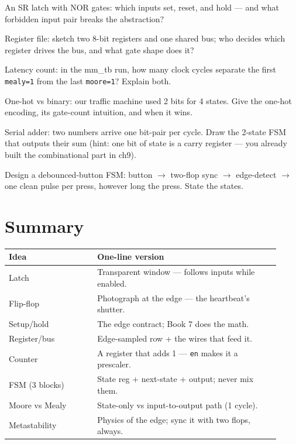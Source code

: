 \begin{exercise}[easy]
An SR latch with NOR gates: which inputs set, reset, and hold — and what
forbidden input pair breaks the abstraction?
\end{exercise}
\begin{exercise}[medium]
Register file: sketch two 8-bit registers and one shared bus; who decides
which register drives the bus, and what gate shape does it?
\end{exercise}
\begin{exercise}[medium]
Latency count: in the mm\_tb run, how many clock cycles separate the
first \texttt{mealy=1} from the last \texttt{moore=1}? Explain both.
\end{exercise}
\begin{exercise}[medium]
One-hot vs binary: our traffic machine used 2 bits for 4 states. Give
the one-hot encoding, its gate-count intuition, and when it wins.
\end{exercise}
\begin{exercise}[medium]
Serial adder: two numbers arrive one bit-pair per cycle. Draw the 2-state
FSM that outputs their sum (hint: one bit of state is a carry register —
you already built the combinational part in ch9).
\end{exercise}
\begin{exercise}[hard]
Design a debounced-button FSM: button $\to$ two-flop sync $\to$
edge-detect $\to$ one clean pulse per press, however long the press.
State the states.
\end{exercise}

\section{Summary}
\label{sec:summary10}

\begin{center}\small
\begin{tabular}{@{}p{0.30\linewidth}p{0.62\linewidth}@{}}
\toprule
\textbf{Idea} & \textbf{One-line version} \\ \midrule
Latch & Transparent window — follows inputs while enabled. \\
Flip-flop & Photograph at the edge — the heartbeat's shutter. \\
Setup/hold & The edge contract; Book 7 does the math. \\
Register/bus & Edge-sampled row + the wires that feed it. \\
Counter & A register that adds 1 — \texttt{en} makes it a prescaler. \\
FSM (3 blocks) & State reg + next-state + output; never mix them. \\
Moore vs Mealy & State-only vs input-to-output path (1 cycle). \\
Metastability & Physics of the edge; sync it with two flops, always. \\
\bottomrule
\end{tabular}
\end{center}


